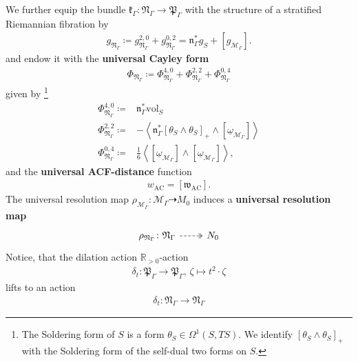 \documentclass[psamsfonts]{amsart}
\theoremstyle{plain}
\theoremstyle{definition}{
\newtheorem{defi}{Definition}[section]
\newtheorem{ass}{Assumption}
\newtheorem*{nota}{Notation}}
\theoremstyle{remark}{
\newtheorem{rem}{Remark}
\newtheorem{ex}{Example}}
\theoremstyle{plain}{
\newtheorem{thm}{Theorem}[section]
\newtheorem{lem}{Lemma}[section]
\newtheorem{cor}{Corollary}[section]
\newtheorem{prop}{Proposition}[section]
\newtheorem{con}{Conjecture}[section]}
\newcommand{\m}[1]{{\mathrm{#1}}}
\begin{document}
We further equip the bundle $\mathfrak{k}_\Gamma \colon\mathfrak{N}_\Gamma\rightarrow \mathfrak{P}_\Gamma $ with the structure of a stratified Riemannian fibration by 
    \begin{align*}
        g_{\mathfrak{N}_\Gamma}\coloneqq g_{\mathfrak{N}_\Gamma}^{2,0}+g_{\mathfrak{N}_\Gamma}^{0,2}=\mathfrak{n}^*_\Gamma g_S+[g_{\mathcal{M}_\Gamma}].
    \end{align*}
and endow it with the \textbf{universal Cayley form }
    \begin{align*}
        \Phi_{\mathfrak{N}_\Gamma}\coloneqq\Phi_{\mathfrak{N}_\Gamma}^{4,0}+\Phi_{\mathfrak{N}_\Gamma}^{2,2}+\Phi_{\mathfrak{N}_\Gamma}^{0,4}
    \end{align*}
    given by \footnote{The Soldering form of $S$ is a form $\theta_S\in \Omega^1(S,TS)$. We identify $[\theta_S\wedge\theta_S]_+$ with the Soldering form of the self-dual two forms on $S$.}
    \begin{align*}
        \Phi_{\mathfrak{N}_\Gamma}^{4,0}\coloneqq&\mathfrak{n}^*_\Gamma\m{vol}_S\\
        \Phi_{\mathfrak{N}_\Gamma}^{2,2}\coloneqq&-\left<\mathfrak{n}^*_\Gamma\left[\theta_{S}\wedge\theta_S\right]_+\wedge[\underline{\omega}_{\mathcal{M}_\Gamma}]\right>\\
        \Phi_{\mathfrak{N}_\Gamma}^{0,4}\coloneqq&\frac{1}{6}\left<[\underline{\omega}_{\mathcal{M}_\Gamma}]\wedge[\underline{\omega}_{\mathcal{M}_\Gamma}]\right>,
    \end{align*}
    and the \textbf{universal ACF-distance} function 
    \begin{align*}
        w_{\m{AC}}=[\mathfrak{w}_{\m{AC}}].
    \end{align*}
    The universal resolution map $\rho_{\mathcal{M}_\Gamma}\colon \mathcal{M}_\Gamma\dashrightarrow M_0$ induces a \textbf{universal resolution map} 
\begin{equation*}
    \begin{tikzcd}
	{{\rho_{\mathfrak{N}_\Gamma}}\colon\mathfrak{N}_\Gamma} & N_0
	\arrow[dashed, two heads, from=1-1, to=1-2]
\end{tikzcd}
\end{equation*}
Notice, that the dilation action $\mathbb{R}_{>0}$-action 
    \begin{align*}
        \delta_t \colon\mathfrak{P}_\Gamma\rightarrow \mathfrak{P}_\Gamma,\, \zeta\mapsto t^2\cdot\zeta
    \end{align*}
    lifts to an action 
    \begin{align*}
        \delta_t \colon\mathfrak{N}_\Gamma\rightarrow\mathfrak{N}_\Gamma
    \end{align*}
\end{document}
